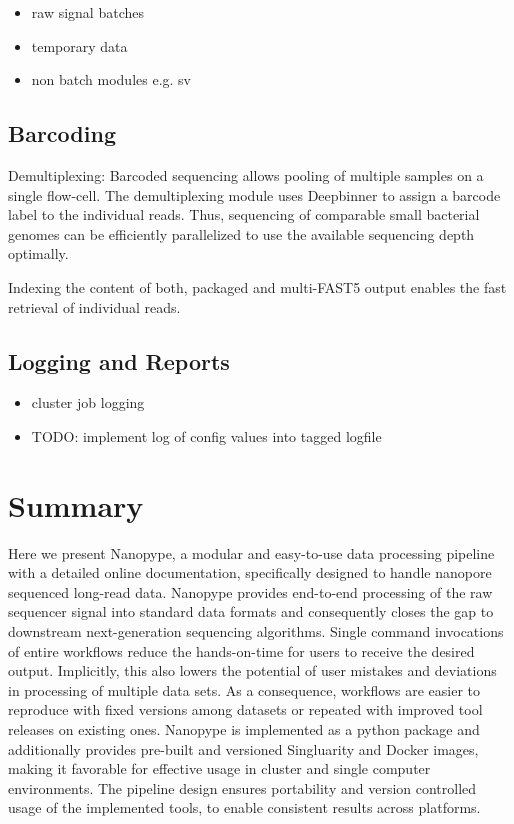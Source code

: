 \begin{itemize}
	\item raw signal batches
	\item temporary data
	\item non batch modules e.g. sv
\end{itemize}

\subsection{Barcoding}

Demultiplexing: Barcoded sequencing allows pooling of multiple samples on a single flow-cell. The demultiplexing module uses Deepbinner \cite{Wick2018} to assign a barcode label to the individual reads. Thus, sequencing of comparable small bacterial genomes can be efficiently parallelized to use the available sequencing depth optimally.

Indexing the content of both, packaged and multi-FAST5 output enables the fast retrieval of individual reads. 

\subsection{Logging and Reports}

\begin{itemize}
	\item cluster job logging
	\item TODO: implement log of config values into tagged logfile
\end{itemize}




\section{Summary}
\label{sec:nanopype:summary}
Here we present Nanopype, a modular and easy-to-use data processing pipeline with a detailed online documentation, specifically designed to handle nanopore sequenced long-read data.
Nanopype provides end-to-end processing of the raw sequencer signal into standard data formats and consequently closes the gap to downstream next-generation sequencing algorithms. Single command invocations of entire workflows reduce the hands-on-time for users to receive the desired output. Implicitly, this also lowers the potential of user mistakes and deviations in processing of multiple data sets. As a consequence, workflows are easier to reproduce with fixed versions among datasets or repeated with improved tool releases on existing ones.
Nanopype is implemented as a python package and additionally provides pre-built and versioned Singluarity and Docker images, making it favorable for effective usage in cluster and single computer environments. The pipeline design ensures portability and version controlled usage of the implemented tools, to enable consistent results across platforms.


